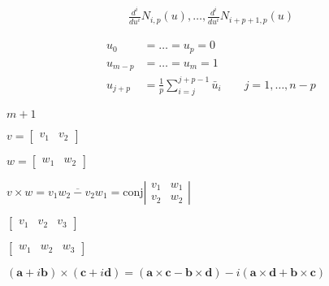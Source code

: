 \documentclass{article}
\begin{document}
\begin{align*} \frac{d^i}{du^i} N_{i,p}(u), \hdots, \frac{d^i}{du^i} N_{i+p+1,p}(u) \end{align*}
\pagebreak

\begin{align*} u_0 & = \hdots = u_p = 0 \\ u_{m-p} & = \hdots = u_{m} = 1 \\ u_{j+p} & = \frac{1}{p}\sum_{i=j}^{j+p-1}\bar{u}_i \quad\quad j=1,\hdots,n-p \end{align*}
\pagebreak

$m+1$
\pagebreak

$ v = \begin{bmatrix} v_1 & v_2 \end{bmatrix} $
\pagebreak

$ w = \begin{bmatrix} w_1 & w_2 \end{bmatrix} $
\pagebreak

$ v\times w = \overline{v_1 w_2 - v_2 w_1} = \text{conj}\left|\begin{smallmatrix} v_1 & w_1 \\ v_2 & w_2 \end{smallmatrix}\right| $
\pagebreak

$ \begin{bmatrix} v_1 & v_2 & v_3 \end{bmatrix} $
\pagebreak

$ \begin{bmatrix} w_1 & w_2 & w_3 \end{bmatrix} $
\pagebreak

$ (\mathbf{a}+i\mathbf{b}) \times (\mathbf{c}+i\mathbf{d}) = (\mathbf{a} \times \mathbf{c} - \mathbf{b} \times \mathbf{d}) - i(\mathbf{a} \times \mathbf{d} + \mathbf{b} \times \mathbf{c})$
\pagebreak
\end{document}

